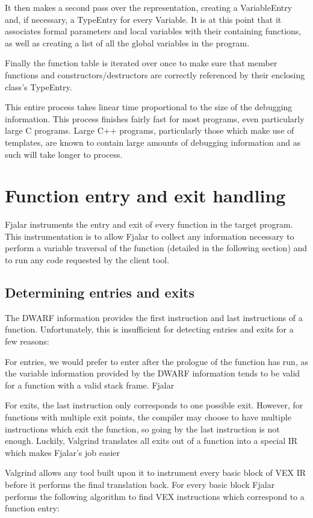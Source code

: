 \documentclass[11pt]{article}
\begin{document}
It then makes a second pass over the representation, creating  a 
VariableEntry and, if necessary, a TypeEntry for every Variable. It is
at this point that it associates formal parameters and local variables
with their containing functions, as well as creating a list of all the
global variables in the program.

Finally the function table is iterated over once to make sure that
member functions and constructors/destructors are correctly referenced
by their enclosing class's TypeEntry.

This entire process takes linear time proportional to the size of the
debugging information. This process finishes fairly fast for most
programs, even particularly large C programs. Large C++ programs,
particularly those which make use of templates, are known to contain
large amounts of debugging information \cite{rotithor1999measurement}
and as such will take longer to process.

\section{Function entry and exit handling}
Fjalar instruments the entry and exit of every function in the target
program. This instrumentation is to allow Fjalar to collect any
information necessary to perform a variable traversal of the function
(detailed in the following section) and to run any code requested by
the client tool.


\subsection{Determining entries and exits}
The DWARF information provides the first instruction and last
instructions of a function. Unfortunately, this
is insufficient for detecting entries and exits for a few reasons:

For entries, we would prefer to enter after the prologue of the
function has run, as the variable information provided by the DWARF
information tends to be valid for a function with a valid stack frame.
Fjalar

For exits, the last instruction only corresponds to one possible
exit. However, for functions with multiple exit points, the compiler
may choose to have multiple instructions which exit the function, so
going by the last instruction is not enough. Luckily, Valgrind
translates all exits out of a function into a special IR which makes
Fjalar's job easier

Valgrind allows any tool built upon it to instrument every basic block
of VEX IR before it performs the final translation back. For every
basic block Fjalar performs the following algorithm to find VEX
instructions which correspond to a function entry:
\end{document}
